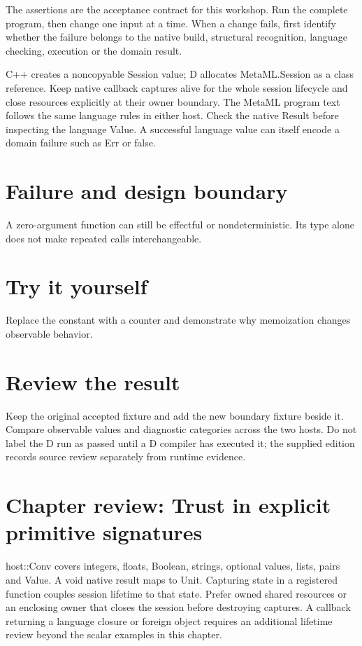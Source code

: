 The assertions are the acceptance contract for this workshop. Run the complete program, then change one input at a time. When a change fails, first identify whether the failure belongs to the native build, structural recognition, language checking, execution or the domain result.

\clearpage
{}
C++ creates a noncopyable Session value; D allocates MetaML.Session as a class reference. Keep native callback captures alive for the whole session lifecycle and close resources explicitly at their owner boundary. The MetaML program text follows the same language rules in either host. Check the native Result before inspecting the language Value. A successful language value can itself encode a domain failure such as Err or false.


\section*{Failure and design boundary}
A zero-argument function can still be effectful or nondeterministic. Its type alone does not make repeated calls interchangeable.

\section*{Try it yourself}
Replace the constant with a counter and demonstrate why memoization changes observable behavior.

\section*{Review the result}
Keep the original accepted fixture and add the new boundary fixture beside it. Compare observable values and diagnostic categories across the two hosts. Do not label the D run as passed until a D compiler has executed it; the supplied edition records source review separately from runtime evidence.

\clearpage
\section*{Chapter review: Trust in explicit primitive signatures}
host::Conv covers integers, floats, Boolean, strings, optional values, lists, pairs and Value. A void native result maps to Unit. Capturing state in a registered function couples session lifetime to that state. Prefer owned shared resources or an enclosing owner that closes the session before destroying captures. A callback returning a language closure or foreign object requires an additional lifetime review beyond the scalar examples in this chapter.

